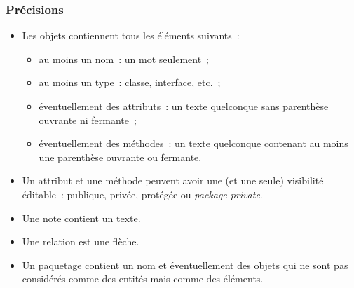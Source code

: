 \documentclass[hidelinks, 10pt,a4paper]{article}
\begin{document}
\subsubsection{Précisions}
\begin{itemize}
 \item Les objets contiennent tous les éléments suivants~:
 \begin{itemize}
    \item au moins un nom~: un mot seulement~;
    \item au moins un type~: classe, interface, etc.~; 
    \item éventuellement des attributs~: un texte quelconque sans parenthèse ouvrante ni fermante~;
    \item éventuellement des méthodes~: un texte quelconque contenant au moins une parenthèse ouvrante ou fermante.
\end{itemize}
 \item Un attribut et une méthode peuvent avoir une (et une seule) visibilité éditable~: publique, privée, protégée ou \textit{package-private}.
 \item Une note contient un texte.
 \item Une relation est une flèche.
 \item Un paquetage contient un nom et éventuellement des objets qui ne sont pas considérés comme des entités mais comme des éléments.
\end{itemize}

\newpage
\end{document}
